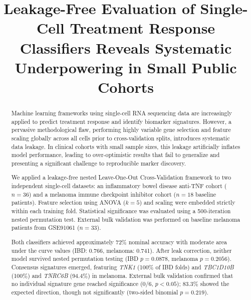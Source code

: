 \documentclass{bmcart}
\begin{document}
\begin{frontmatter}

\begin{fmbox}

\title{Leakage-Free Evaluation of Single-Cell Treatment Response Classifiers Reveals Systematic Underpowering in Small Public Cohorts}

\author[
  addressref={aff1},
  corref={aff1},
  email={patrickchoi@usf.edu}
]{ }

\address[id=aff1]{%
  ,
  ,
  ,
  ,
}

\end{fmbox}

\begin{abstractbox}

\begin{abstract}
Machine learning frameworks using single-cell RNA sequencing data are increasingly applied to predict treatment response and identify biomarker signatures. However, a pervasive methodological flaw, performing highly variable gene selection and feature scaling globally across all cells prior to cross-validation splits, introduces systematic data leakage. In clinical cohorts with small sample sizes, this leakage artificially inflates model performance, leading to over-optimistic results that fail to generalize and presenting a significant challenge to reproducible marker discovery.

We applied a leakage-free nested Leave-One-Out Cross-Validation framework to two independent single-cell datasets: an inflammatory bowel disease anti-TNF cohort ($n=36$) and a melanoma immune checkpoint inhibitor cohort ($n=18$ baseline patients). Feature selection using ANOVA ($k=5$) and scaling were embedded strictly within each training fold. Statistical significance was evaluated using a 500-iteration nested permutation test. External bulk validation was performed on baseline melanoma patients from GSE91061 ($n=33$).

Both classifiers achieved approximately 72\% nominal accuracy with moderate area under the curve values (IBD: 0.766, melanoma: 0.741). After leak correction, neither model survived nested permutation testing (IBD $p=0.0878$, melanoma $p=0.2056$). Consensus signatures emerged, featuring \textit{TNK1} (100\% of IBD folds) and \textit{TBC1D10B} (100\%) and \textit{TNRC6B} (94.4\%) in melanoma. External bulk validation confirmed that no individual signature gene reached significance (0/6, $p < 0.05$); 83.3\% showed the expected direction, though not significantly (two-sided binomial $p = 0.219$).


\end{abstract}
\end{abstractbox}
\end{frontmatter}
\end{document}
